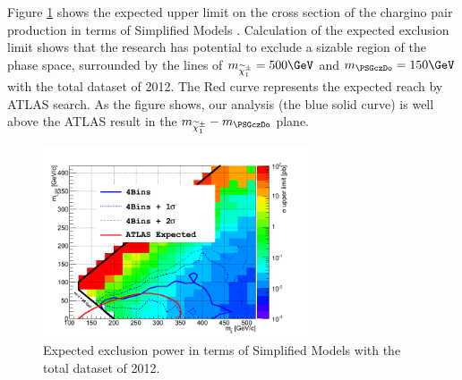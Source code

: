 Figure \ref{fig:limit_final} shows the expected upper limit on the cross section of the chargino pair production in terms of Simplified Models \cite{alves:sms}. 
Calculation of the expected exclusion limit shows that the research has potential to exclude 
a sizable region of the phase space, surrounded by the lines of $m_{\chione} = 500\GeV$ and $m_{\PSGczDo} = 150\GeV$ with 
the total dataset of 2012.
The Red curve represents the expected reach by ATLAS %
search. As the figure shows, our analysis (the blue solid curve) is well above the ATLAS result in the $m_{\chione}-m_{\PSGczDo}$ plane.


\begin{linenomath}
\begin{figure}[h]
\centering
\includegraphics[width=0.7\textwidth,keepaspectratio=true]{StatisticsFig/RealisticsSystematics/Exclusion4Bins.png}
\caption{Expected exclusion power in terms of Simplified Models
with the total dataset of 2012. 
}
\label{fig:limit_final}
\end{figure}
\end{linenomath}
